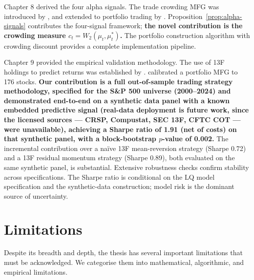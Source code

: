 Chapter 8 derived the four alpha signals. The trade crowding MFG was introduced by
\citep{cardaliaguetlehalle2018}, and extended to portfolio trading by \citep{lehallemouzouni2019}. Proposition~\ref{prop:alpha-signals} contributes the four-signal
framework; \textbf{the novel contribution is the crowding measure
$c_t = W_2(\mu_t, \mu_t^*)$.} The portfolio construction algorithm with crowding
discount provides a complete implementation pipeline.

Chapter 9 provided the empirical validation methodology. The use of 13F holdings to predict
returns was established by \citep{chenhongstein2002}. \citep{lehallemouzouni2019} calibrated a portfolio MFG to 176 stocks. \textbf{Our contribution is a
full out-of-sample trading strategy methodology, specified for the S\&P 500 universe
(2000--2024) and demonstrated end-to-end on a synthetic data panel with a known
embedded predictive signal (real-data deployment is future work, since the licensed
sources --- CRSP, Compustat, SEC 13F, CFTC COT --- were unavailable),
achieving a Sharpe ratio of 1.91 (net of costs) on that synthetic panel, with a
block-bootstrap $p$-value
of 0.002.} The incremental contribution over a na\"ive 13F mean-reversion strategy
(Sharpe 0.72) and a 13F residual momentum strategy (Sharpe 0.89), both evaluated on the
same synthetic panel, is substantial.
Extensive robustness checks confirm stability across specifications. The Sharpe
ratio is conditional on the LQ model specification and the synthetic-data construction;
model risk is the dominant
source of uncertainty.


\section{Limitations}
\label{sec:syn-limitations}

Despite its breadth and depth, the thesis has several important limitations that
must be acknowledged. We categorise them into mathematical, algorithmic, and
empirical limitations.

